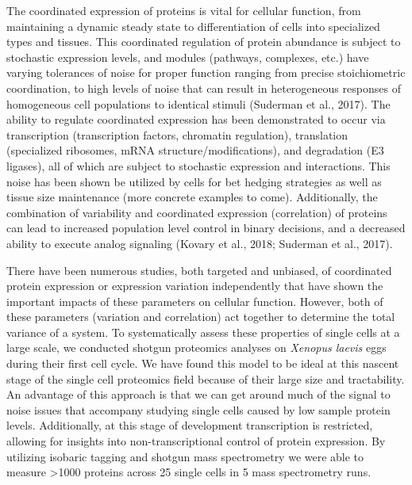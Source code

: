 \documentclass[11pt,]{article}
\begin{document}
The coordinated expression of proteins is vital for cellular function,
from maintaining a dynamic steady state to differentiation of cells into
specialized types and tissues. This coordinated regulation of protein
abundance is subject to stochastic expression levels, and modules
(pathways, complexes, etc.) have varying tolerances of noise for proper
function ranging from precise stoichiometric coordination, to high
levels of noise that can result in heterogeneous responses of
homogeneous cell populations to identical stimuli (Suderman et al.,
2017). The ability to regulate coordinated expression has been
demonstrated to occur via transcription (transcription factors,
chromatin regulation), translation (specialized ribosomes, mRNA
structure/modifications), and degradation (E3 ligases), all of which are
subject to stochastic expression and interactions. This noise has been
shown be utilized by cells for bet hedging strategies as well as tissue
size maintenance (more concrete examples to come). Additionally, the
combination of variability and coordinated expression (correlation) of
proteins can lead to increased population level control in binary
decisions, and a decreased ability to execute analog signaling (Kovary
et al., 2018; Suderman et al., 2017).

There have been numerous studies, both targeted and unbiased, of
coordinated protein expression or expression variation independently
that have shown the important impacts of these parameters on cellular
function. However, both of these parameters (variation and correlation)
act together to determine the total variance of a system. To
systematically assess these properties of single cells at a large scale,
we conducted shotgun proteomics analyses on \emph{Xenopus laevis} eggs
during their first cell cycle. We have found this model to be ideal at
this nascent stage of the single cell proteomics field because of their
large size and tractability. An advantage of this approach is that we
can get around much of the signal to noise issues that accompany
studying single cells caused by low sample protein levels. Additionally,
at this stage of development transcription is restricted, allowing for
insights into non-transcriptional control of protein expression. By
utilizing isobaric tagging and shotgun mass spectrometry we were able to
measure \textgreater{}1000 proteins across 25 single cells in 5 mass
spectrometry runs.
\end{document}
